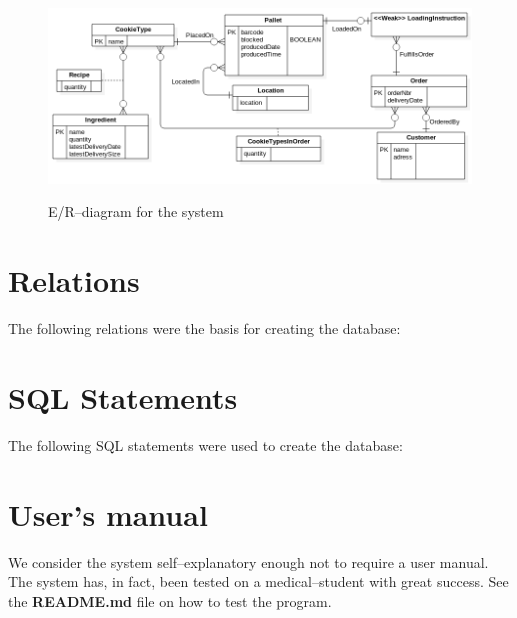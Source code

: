 \documentclass[a4paper]{scrartcl}
\numberwithin{equation}{section}
\begin{document}
\begin{figure}[h!]
  \begin{centering}
    \includegraphics[width=\textwidth]{../ER.png}
    \label{er-diagram}
    \caption{E/R--diagram for the system}
  \end{centering}
\end{figure}

\section*{Relations}
The following relations were the basis for creating the database:


\section*{SQL Statements}
The following SQL statements were used to create the database:


\section*{User's manual}
We consider the system self--explanatory enough not to require a user manual. 
The system has, in fact, been tested on a medical--student with great success. See the \textbf{README.md} file on how to test the program.
\end{document}
